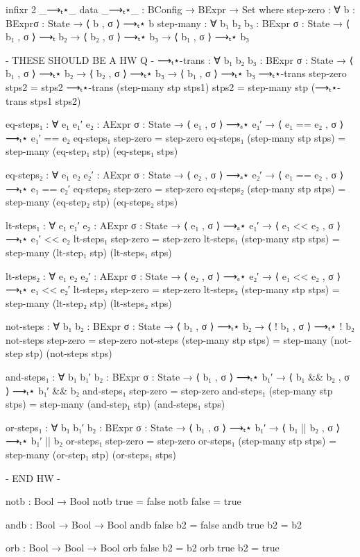 \documentclass{lecturenotes}
\begin{document}
\begin{code}[hide]
infixr 2 _⟶ₜ⋆_
data _⟶ₜ⋆_ : BConfig → BExpr → Set where
  step-zero : ∀ {b : BExpr}{σ : State} → ⟨ b , σ ⟩ ⟶ₜ⋆ b
  step-many : ∀ {b₁ b₂ b₃ : BExpr} {σ : State} →
    ⟨ b₁ , σ ⟩ ⟶ₜ  b₂ →
    ⟨ b₂ , σ ⟩ ⟶ₜ⋆ b₃ →
    ⟨ b₁ , σ ⟩ ⟶ₜ⋆ b₃

{- THESE SHOULD BE A HW Q -}
⟶ₜ⋆-trans : ∀ {b₁ b₂ b₃ : BExpr} {σ : State} →
  ⟨ b₁ , σ ⟩ ⟶ₜ⋆ b₂ →
  ⟨ b₂ , σ ⟩ ⟶ₜ⋆ b₃ →
  ⟨ b₁ , σ ⟩ ⟶ₜ⋆ b₃
⟶ₜ⋆-trans step-zero stps2 = stps2
⟶ₜ⋆-trans (step-many stp stps1) stps2 = step-many stp (⟶ₜ⋆-trans stps1 stps2)

eq-steps₁ : ∀ {e₁ e₁′ e₂ : AExpr} {σ : State} →
  ⟨ e₁ , σ ⟩ ⟶ₐ⋆ e₁′ →
  ⟨ e₁ == e₂ , σ ⟩ ⟶ₜ⋆ e₁′ == e₂
eq-steps₁ step-zero = step-zero
eq-steps₁ (step-many stp stps) = step-many (eq-step₁ stp) (eq-steps₁ stps)

eq-steps₂ : ∀ {e₁ e₂ e₂′ : AExpr} {σ : State} →
  ⟨ e₂ , σ ⟩ ⟶ₐ⋆ e₂′ →
  ⟨ e₁ == e₂ , σ ⟩ ⟶ₜ⋆ e₁ == e₂′ 
eq-steps₂ step-zero = step-zero
eq-steps₂ (step-many stp stps) = step-many (eq-step₂ stp) (eq-steps₂ stps)

lt-steps₁ : ∀ {e₁ e₁′ e₂ : AExpr} {σ : State} →
  ⟨ e₁ , σ ⟩ ⟶ₐ⋆ e₁′ →
  ⟨ e₁ << e₂ , σ ⟩ ⟶ₜ⋆ e₁′ << e₂
lt-steps₁ step-zero = step-zero
lt-steps₁ (step-many stp stps) = step-many (lt-step₁ stp) (lt-steps₁ stps)

lt-steps₂ : ∀ {e₁ e₂ e₂′ : AExpr} {σ : State} →
  ⟨ e₂ , σ ⟩ ⟶ₐ⋆ e₂′ →
  ⟨ e₁ << e₂ , σ ⟩ ⟶ₜ⋆ e₁ << e₂′ 
lt-steps₂ step-zero = step-zero
lt-steps₂ (step-many stp stps) = step-many (lt-step₂ stp) (lt-steps₂ stps)

not-steps : ∀ {b₁ b₂ : BExpr} {σ : State} →
  ⟨ b₁ , σ ⟩ ⟶ₜ⋆ b₂ →
  ⟨ ! b₁ , σ ⟩ ⟶ₜ⋆ ! b₂
not-steps step-zero = step-zero
not-steps (step-many stp stps) = step-many (not-step stp) (not-steps stps)

and-steps₁ : ∀ {b₁ b₁′ b₂ : BExpr} {σ : State} →
  ⟨ b₁ , σ ⟩ ⟶ₜ⋆ b₁′ →
  ⟨ b₁ && b₂ , σ ⟩ ⟶ₜ⋆ b₁′ && b₂
and-steps₁ step-zero = step-zero
and-steps₁ (step-many stp stps) = step-many (and-step₁ stp) (and-steps₁ stps)

or-steps₁ : ∀ {b₁ b₁′ b₂ : BExpr} {σ : State} →
  ⟨ b₁ , σ ⟩ ⟶ₜ⋆ b₁′ →
  ⟨ b₁ || b₂ , σ ⟩ ⟶ₜ⋆ b₁′ || b₂
or-steps₁ step-zero = step-zero
or-steps₁ (step-many stp stps) = step-many (or-step₁ stp) (or-steps₁ stps)

{- END HW -}

notb : Bool → Bool
notb true = false
notb false = true

andb : Bool → Bool → Bool
andb false b2 = false
andb true b2 = b2

orb : Bool → Bool → Bool
orb false b2 = b2
orb true b2 = true


\end{code}
\end{document}
